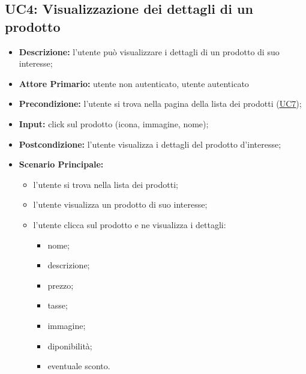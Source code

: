 \subsection{UC4: Visualizzazione dei dettagli di un prodotto }
\label{sec:UC4}
\begin{itemize}
    \item \textbf{Descrizione:} l'utente può visualizzare i dettagli di un prodotto di suo interesse;
    \item \textbf{Attore Primario:} utente non autenticato, utente autenticato
    \item \textbf{Precondizione:} l'utente si trova nella pagina della lista dei prodotti (\hyperref[sec:UC7]{\underline{UC7}});
    \item \textbf{Input:} click sul prodotto (icona, immagine, nome);
    \item \textbf{Postcondizione:} l'utente visualizza i dettagli del prodotto d'interesse;
    \item \textbf{Scenario Principale:}
          \begin{itemize}
              \item l'utente si trova nella lista dei prodotti;
              \item l'utente visualizza un prodotto di suo interesse;
              \item l'utente clicca sul prodotto e ne visualizza i dettagli:
                    \begin{itemize}
                        \item nome;
                        \item descrizione;
                        \item prezzo;
                        \item tasse;
                        \item immagine;
                        \item diponibilità;
                        \item eventuale sconto.
                    \end{itemize}
          \end{itemize}
\end{itemize}